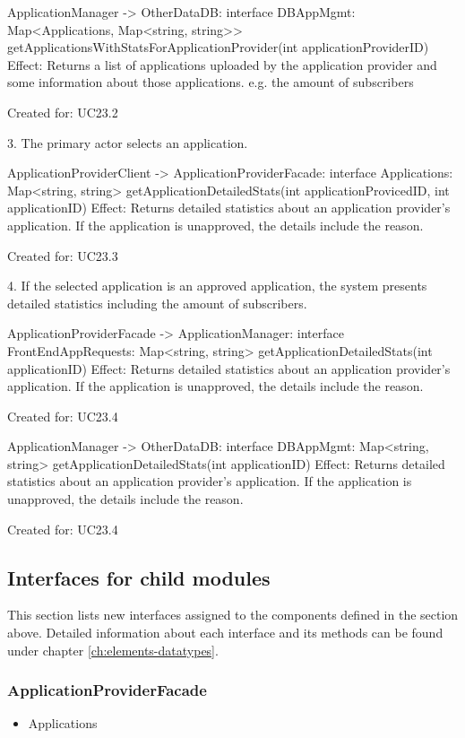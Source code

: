             ApplicationManager -> OtherDataDB: interface DBAppMgmt: Map<Applications, Map<string, string>> getApplicationsWithStatsForApplicationProvider(int applicationProviderID)
                Effect: Returns a list of applications uploaded by the application provider and some information about those applications. e.g. the amount of subscribers
                \item Created for: UC23.2

        3. The primary actor selects an application.

            ApplicationProviderClient -> ApplicationProviderFacade: interface Applications: Map<string, string> getApplicationDetailedStats(int applicationProvicedID, int applicationID)
                Effect: Returns detailed statistics about an application provider's application. If the application is unapproved, the details include the reason.
                \item Created for: UC23.3

        4. If the selected application is an approved application, the system presents detailed statistics including the amount of subscribers.

            ApplicationProviderFacade -> ApplicationManager: interface FrontEndAppRequests: Map<string, string> getApplicationDetailedStats(int applicationID)
                Effect: Returns detailed statistics about an application provider's application. If the application is unapproved, the details include the reason.
                \item Created for: UC23.4

            ApplicationManager -> OtherDataDB: interface DBAppMgmt: Map<string, string> getApplicationDetailedStats(int applicationID)
                Effect: Returns detailed statistics about an application provider's application. If the application is unapproved, the details include the reason.
                \item Created for: UC23.4


\subsection{Interfaces for child modules}
    This section lists new interfaces assigned to the components defined
    in the section above. Detailed information about each interface and
    its methods can be found under chapter \ref{ch:elements-datatypes}.

    \subsubsection{ApplicationProviderFacade}
        \begin{itemize}
            \item Applications
        \end{itemize}

